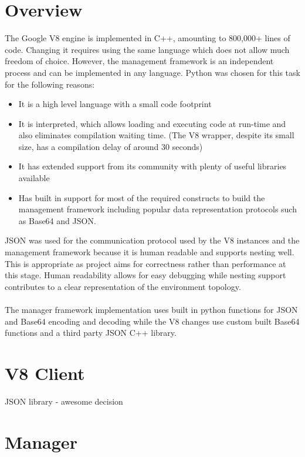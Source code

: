 \documentclass{l4proj}
\begin{document}
\section{Overview}
\hspace*{3em} The Google V8 engine is implemented in C++, amounting to 800,000+ lines of code. Changing it requires using the same language which does not allow much freedom of choice. However, the management framework is an independent process and can be implemented in any language. Python was chosen for this task for the following reasons:
\begin{itemize}
\item It is a high level language with a small code footprint
\item It is interpreted, which allows loading and executing code at run-time and also eliminates compilation waiting time. (The V8 wrapper, despite its small size, has a compilation delay of around 30 seconds)
\item It has extended support from its community with plenty of useful libraries available
\item Has built in support for most of the required constructs to build the management framework including popular data representation protocols such as Base64 and JSON.
\end{itemize}
\hspace*{3em} JSON was used for the communication protocol used by the V8 instances and the management framework because it is human readable and supports nesting well. This is appropriate as project aims for correctness rather than performance at this stage. Human readability allows for easy debugging while nesting support contributes to a clear representation of the environment topology.
\\\\
\hspace*{3em} The manager framework implementation uses built in python functions for JSON and Base64 encoding and decoding while the V8 changes use custom built Base64 functions and a third party JSON C++ library. 
\section{V8 Client}
JSON library - awesome decision
\section{Manager}
\end{document}
